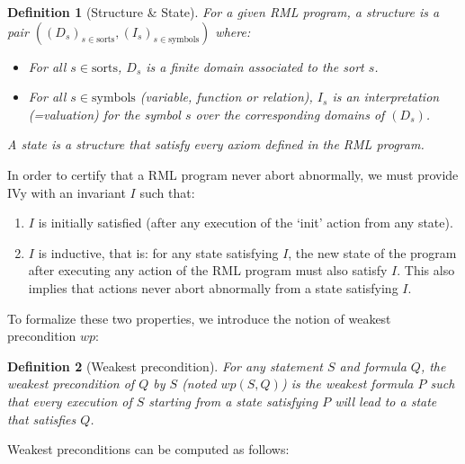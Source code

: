 \documentclass[11pt,a4paper,oldfontcommands]{memoir}
\newtheorem*{definition}{Definition}
\begin{document}
    \begin{definition}[Structure \& State]
        For a given RML program, a structure is a pair \(((D_s)_{s\in \text{sorts}}, (I_s)_{s\in \text{symbols}})\) where:
        \begin{itemize}
            \item For all \(s \in \text{sorts}\), \(D_s\) is a finite domain associated to the sort \(s\).
            \item For all \(s \in \text{symbols}\) (variable, function or relation), \(I_s\) is an interpretation (=valuation) for the symbol \(s\) over the corresponding domains of \((D_s)\).
        \end{itemize}
        A state is a structure that satisfy every axiom defined in the RML program.
    \end{definition}

    In order to certify that a RML program never abort abnormally, we must provide IVy with an invariant \(I\) such that:
    \begin{enumerate}
        \item \(I\) is initially satisfied (after any execution of the `init' action from any state).
        \item \(I\) is inductive, that is: for any state satisfying \(I\), the new state of the program after executing any action of the RML program must also satisfy \(I\).
        This also implies that actions never abort abnormally from a state satisfying \(I\).
    \end{enumerate}

    To formalize these two properties, we introduce the notion of weakest precondition \(wp\):
    \begin{definition}[Weakest precondition]
        For any statement \(S\) and formula \(Q\), the weakest precondition of \(Q\) by \(S\) (noted \(wp(S,Q)\)) is the weakest formula \(P\) such that
        every execution of \(S\) starting from a state satisfying \(P\) will lead to a state that satisfies \(Q\).
    \end{definition}

    Weakest preconditions can be computed as follows:\\
\end{document}
